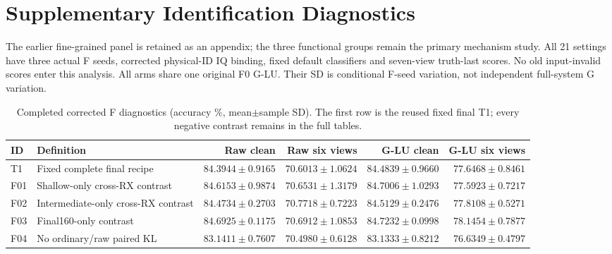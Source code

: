 \section{Supplementary Identification Diagnostics}

\label{app:fine-F}

The earlier fine-grained panel is retained as an appendix; the three functional groups remain the primary mechanism study. All 21 settings have three actual F seeds, corrected physical-ID IQ binding, fixed default classifiers and seven-view truth-last scores. No old input-invalid scores enter this analysis. All arms share one original F0 G-LU. Their SD is conditional F-seed variation, not independent full-system G variation.

\begin{table}[t]

\centering\scriptsize

\caption{Completed corrected F diagnostics (accuracy \%, mean$\pm$sample SD). The first row is the reused fixed final T1; every negative contrast remains in the full tables.}

\label{tab:fine-F-complete}

\setlength{\tabcolsep}{3pt}

\begin{tabular}{lp{}rrrr}

\toprule

ID & Definition & Raw clean & Raw six views & G-LU clean & G-LU six views \\

\midrule

T1 & Fixed complete final recipe & $84.3944\pm0.9165$ & $70.6013\pm1.0624$ & $84.4839\pm0.9660$ & $77.6468\pm0.8461$ \\

F01 & Shallow-only cross-RX contrast & $84.6153\pm0.9874$ & $70.6531\pm1.3179$ & $84.7006\pm1.0293$ & $77.5923\pm0.7217$ \\

F02 & Intermediate-only cross-RX contrast & $84.4734\pm0.2703$ & $70.7718\pm0.7223$ & $84.5129\pm0.2476$ & $77.8108\pm0.5271$ \\

F03 & Final160-only contrast & $84.6925\pm0.1175$ & $70.6912\pm1.0853$ & $84.7232\pm0.0998$ & $78.1454\pm0.7877$ \\

F04 & No ordinary/raw paired KL & $83.1411\pm0.7607$ & $70.4980\pm0.6128$ & $83.1333\pm0.8212$ & $76.6349\pm0.4797$ \\


\end{tabular}
\end{table}
